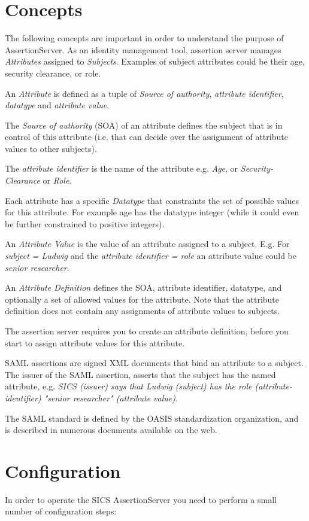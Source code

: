 \documentclass[10pt,a4paper]{article}
\begin{document}
\section{Concepts}
The following concepts are important in order to understand the purpose of 
AssertionServer. As an identity management tool, assertion server manages 
\emph{Attributes} assigned to \emph{Subjects}. Examples of subject attributes 
could be their age, security clearance, or role.

An \emph{Attribute} is defined as a tuple of \emph{Source of authority},
\emph{attribute identifier}, \emph{datatype} and \emph{attribute value}.

The \emph{Source of authority} (SOA) of an attribute defines the subject
that is in control of this attribute (i.e. that can decide over the
assignment of attribute values to other subjects).

The \emph{attribute identifier} is the name of the attribute e.g. \emph{Age},
or \emph{Security-Clearance} or \emph{Role}.

Each attribute has a specific \emph{Datatype} that constraints the set of
possible values for this attribute. For example age has the datatype integer 
(while it could even be further constrained to positive integers).

An \emph{Attribute Value} is the value of an attribute assigned to a subject.
E.g. For \emph{subject = Ludwig} and the \emph{attribute identifier = role}
an attribute value could be \emph{senior researcher}.

An \emph{Attribute Definition} defines the SOA, attribute identifier, datatype,
and optionally a set of allowed values for the attribute. Note that the 
attribute definition does not contain any assignments of attribute values to
subjects. 

The assertion server requires you to create an attribute definition, before you
start to assign attribute values for this attribute.

SAML assertions are signed XML documents that bind an attribute to a subject.
The issuer of the SAML assertion, asserts that the subject has the named
attribute, e.g. \emph{SICS (issuer) says that Ludwig (subject) has the role 
(attribute-identifier) "senior researcher" (attribute value)}.

The SAML standard is defined by the OASIS standardization organization, and
is described in numerous documents available on the web.

\section{Configuration}\label{configure}
In order to operate the SICS AssertionServer you need to perform a small number
of configuration steps:
\end{document}
